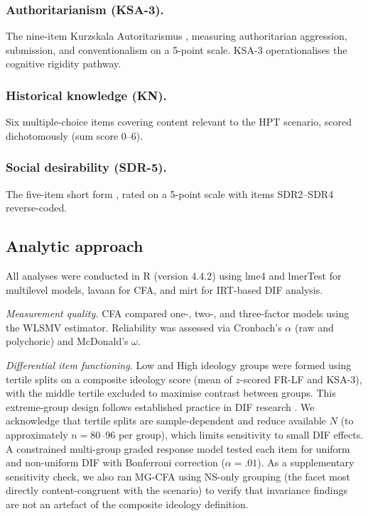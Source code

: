 \documentclass[pdflatex,sn-apa]{sn-jnl}%
\begin{document}
\subsubsection{Authoritarianism (KSA-3).}\label{subsubsec:ksa}

The nine-item Kurzskala Autoritarismus \citep{Beierlein2014}, measuring authoritarian aggression, submission, and conventionalism on a 5-point scale. KSA-3 operationalises the cognitive rigidity pathway.

\subsubsection{Historical knowledge (KN).}\label{subsubsec:kn}

Six multiple-choice items covering content relevant to the HPT scenario, scored dichotomously (sum score 0--6).

\subsubsection{Social desirability (SDR-5).}\label{subsubsec:sdr}

The five-item short form \citep{Hays1989}, rated on a 5-point scale with items SDR2--SDR4 reverse-coded.

\subsection{Analytic approach}\label{subsec:analytic}

All analyses were conducted in R (version 4.4.2) using lme4 and lmerTest for multilevel models, lavaan for CFA, and mirt for IRT-based DIF analysis.

\emph{Measurement quality.} CFA compared one-, two-, and three-factor models using the WLSMV estimator. Reliability was assessed via Cronbach's $\alpha$ (raw and polychoric) and McDonald's $\omega$.

\emph{Differential item functioning.} Low and High ideology groups were formed using tertile splits on a composite ideology score (mean of $z$-scored FR-LF and KSA-3), with the middle tertile excluded to maximise contrast between groups. This extreme-group design follows established practice in DIF research \citep{Finch2005}. We acknowledge that tertile splits are sample-dependent and reduce available $N$ (to approximately $n = 80$--96 per group), which limits sensitivity to small DIF effects. A constrained multi-group graded response model tested each item for uniform and non-uniform DIF with Bonferroni correction ($\alpha = .01$). As a supplementary sensitivity check, we also ran MG-CFA using NS-only grouping (the facet most directly content-congruent with the scenario) to verify that invariance findings are not an artefact of the composite ideology definition.
\end{document}
